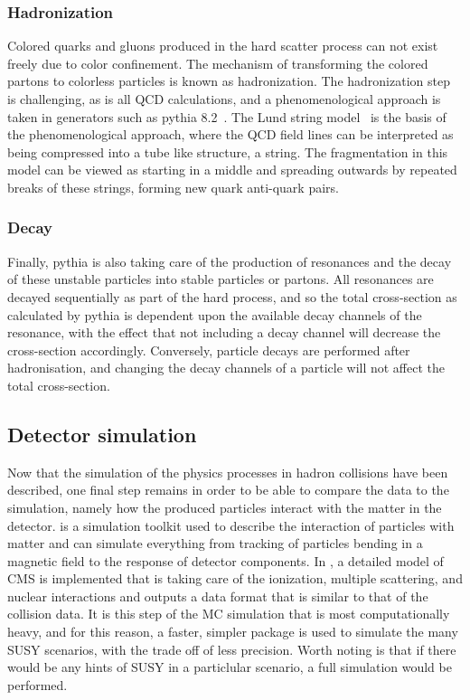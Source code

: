 \subsubsection{Hadronization}
Colored quarks and gluons produced in the hard scatter process can not exist freely due to color confinement. 
The mechanism of transforming the colored partons to colorless particles is known as hadronization. 
The hadronization step is challenging, as is all QCD calculations, and a phenomenological approach is taken in generators such as {\sc pythia} 8.2~\cite{Sjostrand:2014zea}.
The Lund string model~\cite{Andersson:1983ia} is the basis of the phenomenological approach, where the QCD field lines can be interpreted as being compressed into a tube like structure, a string. 
The fragmentation in this model can be viewed as starting in a middle and spreading outwards by repeated breaks of these strings, forming new quark anti-quark pairs. 
\subsubsection{Decay}
Finally, {\sc pythia} is also taking care of the production of resonances and the decay of these unstable particles into stable particles or partons.  
All resonances are decayed sequentially as part of the hard process, and so the total cross-section as calculated by {\sc pythia} is dependent upon the available decay channels of the resonance, with the effect that not including a decay channel will decrease the cross-section accordingly. 
Conversely, particle decays are performed after hadronisation, and changing the decay channels of a particle will not affect the total cross-section.  
\subsection{Detector simulation}
Now that the simulation of the physics processes in hadron collisions have been described, one final step remains in order to be able to compare the data to the simulation, namely how the produced particles interact with the matter in the detector. 
\GEANTfour is a simulation toolkit used to describe the interaction of particles with matter and can simulate everything from tracking of particles bending in a magnetic field to the response of detector components. 
In \GEANTfour, a detailed model of CMS is implemented that is taking care of the ionization, multiple scattering, and nuclear interactions and outputs a data format that is similar to that of the collision data. 
It is this step of the MC simulation that is most computationally heavy, and for this reason, a faster, simpler package is used to simulate the many SUSY scenarios, with the trade off of less precision. 
Worth noting is that if there would be any hints of SUSY in a particlular scenario, a full simulation would be performed.
